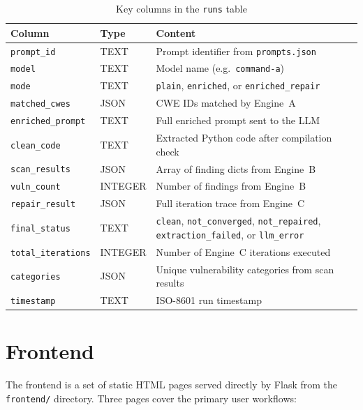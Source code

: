 \documentclass[12pt,a4paper]{report}
\begin{document}
\begin{table}[H]
\centering
\caption{Key columns in the \texttt{runs} table}
\label{tab:schema}
\renewcommand{\arraystretch}{1.3}
\begin{tabularx}{\textwidth}{@{}llX@{}}
\toprule
\textbf{Column} & \textbf{Type} & \textbf{Content} \\
\midrule
\texttt{prompt\_id}       & TEXT    & Prompt identifier from \texttt{prompts.json} \\
\texttt{model}            & TEXT    & Model name (e.g.\ \texttt{command-a}) \\
\texttt{mode}             & TEXT    & \texttt{plain}, \texttt{enriched}, or \texttt{enriched\_repair} \\
\texttt{matched\_cwes}    & JSON    & CWE IDs matched by Engine~A \\
\texttt{enriched\_prompt} & TEXT    & Full enriched prompt sent to the LLM \\
\texttt{clean\_code}      & TEXT    & Extracted Python code after compilation check \\
\texttt{scan\_results}    & JSON    & Array of finding dicts from Engine~B \\
\texttt{vuln\_count}      & INTEGER & Number of findings from Engine~B \\
\texttt{repair\_result}   & JSON    & Full iteration trace from Engine~C \\
\texttt{final\_status}    & TEXT    & \texttt{clean}, \texttt{not\_converged},
                                      \texttt{not\_repaired}, \texttt{extraction\_failed},
                                      or \texttt{llm\_error} \\
\texttt{total\_iterations}& INTEGER & Number of Engine~C iterations executed \\
\texttt{categories}       & JSON    & Unique vulnerability categories from scan results \\
\texttt{timestamp}        & TEXT    & ISO-8601 run timestamp \\
\bottomrule
\end{tabularx}
\end{table}

\section{Frontend}
\label{sec:frontend}

The frontend is a set of static HTML pages served directly by Flask from the
\texttt{frontend/} directory. Three pages cover the primary user workflows:
\end{document}
